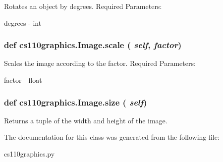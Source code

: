 Rotates an object by degrees. Required Parameters:
\begin{DoxyItemize}
\item degrees -\/ int 
\end{DoxyItemize}\hypertarget{classcs110graphics_1_1Image_a7a59fde33fe83916a4155fafb5cfb01e}{
\subsubsection[{scale}]{\setlength{\rightskip}{0pt plus 5cm}def cs110graphics.Image.scale ( {\em self}, \/   {\em factor})}}
\label{classcs110graphics_1_1Image_a7a59fde33fe83916a4155fafb5cfb01e}


Scales the image according to the factor. Required Parameters:
\begin{DoxyItemize}
\item factor -\/ float 
\end{DoxyItemize}\hypertarget{classcs110graphics_1_1Image_a4ff2da7a167a433f2c38f1e2e2fe7263}{
\subsubsection[{size}]{\setlength{\rightskip}{0pt plus 5cm}def cs110graphics.Image.size ( {\em self})}}
\label{classcs110graphics_1_1Image_a4ff2da7a167a433f2c38f1e2e2fe7263}


Returns a tuple of the width and height of the image. 

The documentation for this class was generated from the following file:\begin{DoxyCompactItemize}
\item 
cs110graphics.py\end{DoxyCompactItemize}
